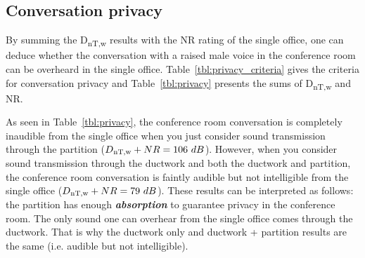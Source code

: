 





\subsection{Conversation privacy} \label{sec:Q4.4}

By summing the D\textsubscript{nT,w} results with the NR rating of the single office, one can deduce whether the conversation with a raised male voice in the conference room can be overheard in the single office.
Table~\ref{tbl:privacy_criteria} gives the criteria for conversation privacy and Table~\ref{tbl:privacy} presents the sums of D\textsubscript{nT,w} and NR.

As seen in Table~\ref{tbl:privacy}, the conference room conversation is completely inaudible from the single office when you just consider sound transmission through the partition ($D\textsubscript{nT,w} + NR = 106~dB$).
However, when you consider sound transmission through the ductwork and both the ductwork and partition, the conference room conversation is faintly audible but not intelligible from the single office ($D\textsubscript{nT,w} + NR = 79~dB$).
These results can be interpreted as follows:
the partition has enough \textbf{\textit{absorption}} to guarantee privacy in the conference room. 
The only sound one can overhear from the single office comes through the ductwork.
That is why the ductwork only and ductwork + partition results are the same (i.e. audible but not intelligible).



